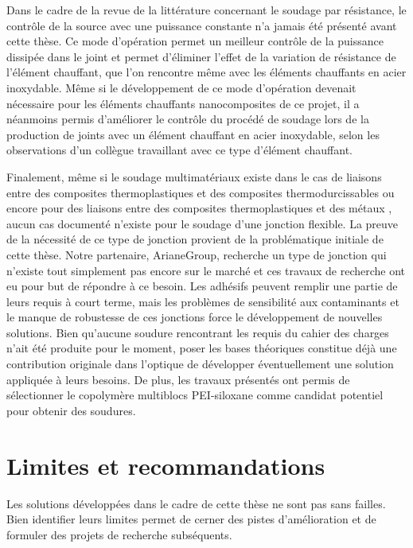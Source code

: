 Dans le cadre de la revue de la littérature concernant le soudage par résistance, le contrôle de la source avec une puissance constante n'a jamais été présenté avant cette thèse.  
Ce mode d'opération permet un meilleur contrôle de la puissance dissipée dans le joint et permet d'éliminer l'effet de la variation de résistance de l'élément chauffant, que l'on rencontre même avec les éléments chauffants en acier inoxydable. 
Même si le développement de ce mode d'opération devenait nécessaire pour les éléments chauffants nanocomposites de ce projet, il a néanmoins permis d'améliorer le contrôle du procédé de soudage lors de la production de joints avec un élément chauffant en acier inoxydable, selon les observations d'un collègue travaillant avec ce type d'élément chauffant. 

Finalement, même si le soudage multimatériaux existe dans le cas de liaisons entre des composites thermoplastiques et des composites thermodurcissables \cite{FernandezVillegas2015,Lionetto2018a} ou encore pour des liaisons entre des composites thermoplastiques et des métaux \cite{Weidmann2018,Kruger2004,Balle2009,Goushegir2016}, aucun cas documenté n'existe pour le soudage d'une jonction flexible. 
La preuve de la nécessité de ce type de jonction provient de la problématique initiale de cette thèse.
Notre partenaire, ArianeGroup, recherche un type de jonction qui n'existe tout simplement pas encore sur le marché et ces travaux de recherche ont eu pour but de répondre à ce besoin. 
Les adhésifs peuvent remplir une partie de leurs requis à court terme, mais les problèmes de sensibilité aux contaminants et le manque de robustesse de ces jonctions force le développement de nouvelles solutions. 
Bien qu'aucune soudure rencontrant les requis du cahier des charges n'ait été produite pour le moment, poser les bases théoriques constitue déjà une contribution originale dans l'optique de développer éventuellement une solution appliquée à leurs besoins. 
De plus, les travaux présentés ont permis de sélectionner le copolymère multiblocs PEI-siloxane comme candidat potentiel pour obtenir des soudures. 

\section{Limites et recommandations}

Les solutions développées dans le cadre de cette thèse ne sont pas sans failles. 
Bien identifier leurs limites permet de cerner des pistes d'amélioration et de formuler des projets de recherche subséquents. 

